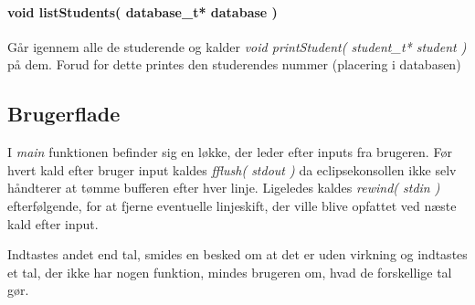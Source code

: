 \paragraph{void listStudents( database\_t* database )} Går igennem alle de
studerende og kalder \emph{void printStudent( student\_t* student )} på dem.
Forud for dette printes den studerendes nummer (placering i databasen)

\subsection{Brugerflade}
I \emph{main} funktionen befinder sig en løkke, der leder efter inputs fra
brugeren. Før hvert kald efter bruger input kaldes \emph{fflush( stdout )} da
eclipsekonsollen ikke selv håndterer at tømme bufferen efter hver linje.
Ligeledes kaldes \emph{rewind( stdin )} efterfølgende, for at fjerne eventuelle
linjeskift, der ville blive opfattet ved næste kald efter input.

Indtastes andet end tal, smides en besked om at det er uden virkning og
indtastes et tal, der ikke har nogen funktion, mindes brugeren om, hvad de
forskellige tal gør.
